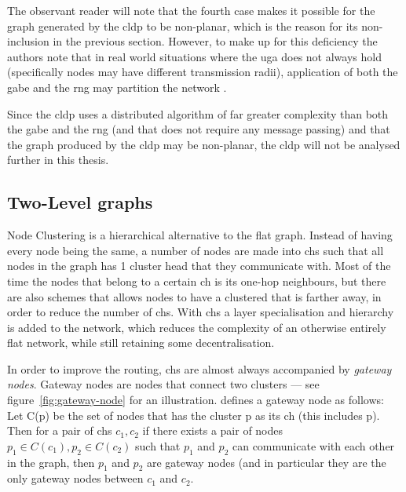 The observant reader will note that the fourth case makes it possible for the graph generated by the \ac{cldp} to be non-planar, which is the reason for its non-inclusion in the previous section. However, to make up for this deficiency the authors note that in real world situations where the \ac{uga} does not always hold (specifically nodes may have different transmission radii), application of both the \ac{gabe} and the \ac{rng} may partition the network \cite{practical}. 

Since the \ac{cldp} uses a distributed algorithm of far greater complexity than both the \ac{gabe} and the \ac{rng} (and that does not require any message passing) and that the graph produced by the \ac{cldp} may be non-planar, the \ac{cldp} will not be analysed further in this thesis.

\subsection{Two-Level graphs}


\label{section:cluster_methods}
Node Clustering is a hierarchical alternative to the flat graph. Instead of having every node being the same, a number of nodes are made into \acp{ch} such that all nodes in the graph has 1 cluster head that they communicate with. Most of the time the nodes that belong to a certain \ac{ch} is its one-hop neighbours, but there are also schemes that allows nodes to have a clustered that is farther away, in order to reduce the number of \acp{ch}. With \acp{ch} a layer specialisation and hierarchy is added to the network, which reduces the complexity of an otherwise entirely flat network, while still retaining some decentralisation.

In order to improve the routing, \acp{ch} are almost always accompanied by \emph{gateway nodes}. Gateway nodes are nodes that connect two clusters --- see figure~\ref{fig:gateway-node} for an illustration. \cite{spanners} defines a gateway node as follows:
Let C(p) be the set of nodes that has the cluster p as its \ac{ch} (this includes p). Then for a pair of \acp{ch} $c_1, c_2$ if there exists a pair of nodes $p_1 \in C(c_1), p_2 \in C(c_2)$ such that $p_1$ and $p_2$ can communicate with each other in the graph, then $p_1$ and $p_2$ are gateway nodes (and in particular they are the only gateway nodes between $c_1$ and $c_2$.  

